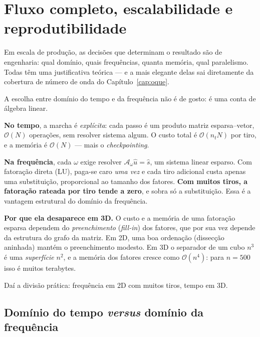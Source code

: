 \documentclass[11pt,a4paper,oneside]{report}
\begin{document}
\chapter{Fluxo completo, escalabilidade e reprodutibilidade}
\label{cap:completa}

\begin{ideia}
Em escala de produ\c{c}\~ao, as decis\~oes que determinam o resultado s\~ao de
engenharia: qual dom\'inio, quais frequ\^encias, quanta mem\'oria, qual
paralelismo. Todas t\^em uma justificativa te\'orica --- e a mais elegante
delas sai diretamente da cobertura de n\'umero de onda do
Cap\'itulo~\ref{cap:oque}.
\end{ideia}

\begin{matematica}
A escolha entre dom\'inio do tempo e da frequ\^encia n\~ao \'e de gosto: \'e
uma conta de \'algebra linear.

\textbf{No tempo}, a marcha \'e \emph{expl\'icita}: cada passo \'e um produto
matriz esparsa--vetor, $\mathcal{O}(N)$ opera\c{c}\~oes, sem resolver sistema
algum. O custo total \'e $\mathcal{O}(n_t N)$ por tiro, e a mem\'oria \'e
$\mathcal{O}(N)$ --- mais o \emph{checkpointing}.

\textbf{Na frequ\^encia}, cada $\omega$ exige resolver
$\mathcal{A}_\omega \hat u = \hat s$, um sistema linear esparso. Com
fatora\c{c}\~ao direta (LU), paga-se caro \emph{uma vez} e cada tiro adicional
custa apenas uma substitui\c{c}\~ao, proporcional ao tamanho dos fatores.
\textbf{Com muitos tiros, a fatora\c{c}\~ao rateada por tiro tende a zero}, e
sobra s\'o a substitui\c{c}\~ao. Essa \'e a vantagem estrutural do
dom\'inio da frequ\^encia.

\textbf{Por que ela desaparece em 3D.} O custo e a mem\'oria de uma
fatora\c{c}\~ao esparsa dependem do \emph{preenchimento} (\emph{fill-in}) dos
fatores, que por sua vez depende da estrutura do grafo da matriz. Em 2D, uma
boa ordena\c{c}\~ao (dissec\c{c}\~ao aninhada) mant\'em o preenchimento
modesto. Em 3D o separador de um cubo $n^{3}$ \'e uma \emph{superf\'icie}
$n^{2}$, e a mem\'oria dos fatores cresce como $\mathcal{O}(n^{4})$: para
$n = 500$ isso \'e muitos terabytes.

Da\'i a divis\~ao pr\'atica: frequ\^encia em 2D com muitos tiros, tempo em 3D.
\end{matematica}

\section{Dom\'inio do tempo \emph{versus} dom\'inio da frequ\^encia}
\end{document}
